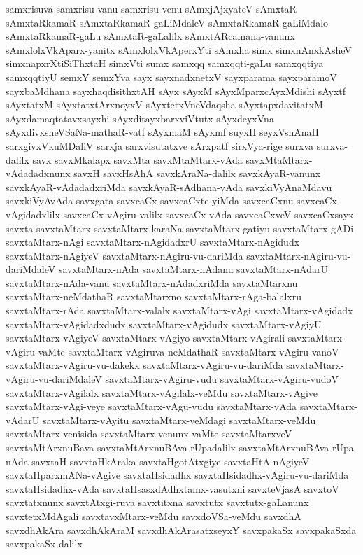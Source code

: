 {samxrisuva
samxrisu-vanu
samxrisu-venu
sAmxjAjxyateV
sAmxtaR
sAmxtaRkamaR
sAmxtaRkamaR-gaLiMdaleV
sAmxtaRkamaR-gaLiMdalo
sAmxtaRkamaR-gaLu
sAmxtaR-gaLalilx
sAmxtARcamana-vanunx
sAmxlolxVkAparx-yanitx
sAmxlolxVkAperxYti
sAmxha
simx
simxnAnxkAsheV
simxnapxrXtiSiThxtaH
simxVti
sumx
samxqq
samxqqti-gaLu
samxqqtiya
samxqqtiyU
semxY
semxYva
sayx
sayxnadxnetxV
sayxparama
sayxparamoV
sayxbaMdhana
sayxhaqdisithxtAH
sAyx
sAyxM
sAyxMparxcAyxMdishi
sAyxtf
sAyxtatxM
sAyxtatxtArxnoyxV
sAyxtetxVneVdaqsha
sAyxtapxdavitatxM
sAyxdamaqtatavxsayxhi
sAyxditayxbarxviVtutx
sAyxdeyxVna
sAyxdivxsheVSaNa-mathaR-vatf
sAyxmaM
sAyxmf
suyxH
seyxVshAnaH
sarxgivxVkuMDaliV
sarxja
sarxvisutatxve
sArxpatf
sirxVya-rige
surxva
surxva-dalilx
savx
savxMkalapx
savxMta
savxMtaMtarx-vAda
savxMtaMtarx-vAdadadxnunx
savxH
savxHsAhA
savxkAraNa-dalilx
savxkAyaR-vanunx
savxkAyaR-vAdadadxriMda
savxkAyaR-sAdhana-vAda
savxkiVyAnaMdavu
savxkiVyAvAda
savxgata
savxcaCx
savxcaCxte-yiMda
savxcaCxnu
savxcaCx-vAgidadxlilx
savxcaCx-vAgiru-valilx
savxcaCx-vAda
savxcaCxveV
savxcaCxsayx
savxta
savxtaMtarx
savxtaMtarx-karaNa
savxtaMtarx-gatiyu
savxtaMtarx-gADi
savxtaMtarx-nAgi
savxtaMtarx-nAgidadxrU
savxtaMtarx-nAgidudx
savxtaMtarx-nAgiyeV
savxtaMtarx-nAgiru-vu-dariMda
savxtaMtarx-nAgiru-vu-dariMdaleV
savxtaMtarx-nAda
savxtaMtarx-nAdanu
savxtaMtarx-nAdarU
savxtaMtarx-nAda-vanu
savxtaMtarx-nAdadxriMda
savxtaMtarxnu
savxtaMtarx-neMdathaR
savxtaMtarxno
savxtaMtarx-rAga-balalxru
savxtaMtarx-rAda
savxtaMtarx-valalx
savxtaMtarx-vAgi
savxtaMtarx-vAgidadx
savxtaMtarx-vAgidadxdudx
savxtaMtarx-vAgidudx
savxtaMtarx-vAgiyU
savxtaMtarx-vAgiyeV
savxtaMtarx-vAgiyo
savxtaMtarx-vAgirali
savxtaMtarx-vAgiru-vaMte
savxtaMtarx-vAgiruva-neMdathaR
savxtaMtarx-vAgiru-vanoV
savxtaMtarx-vAgiru-vu-dakekx
savxtaMtarx-vAgiru-vu-dariMda
savxtaMtarx-vAgiru-vu-dariMdaleV
savxtaMtarx-vAgiru-vudu
savxtaMtarx-vAgiru-vudoV
savxtaMtarx-vAgilalx
savxtaMtarx-vAgilalx-veMdu
savxtaMtarx-vAgive
savxtaMtarx-vAgi-veye
savxtaMtarx-vAgu-vudu
savxtaMtarx-vAda
savxtaMtarx-vAdarU
savxtaMtarx-vAyitu
savxtaMtarx-veMdagi
savxtaMtarx-veMdu
savxtaMtarx-venisida
savxtaMtarx-venunx-vaMte
savxtaMtarxveV
savxtaMtArxnuBava
savxtaMtArxnuBAva-rUpadalilx
savxtaMtArxnuBAva-rUpa-nAda
savxtaH
savxtaHkAraka
savxtaHgotAtxgiye
savxtaHtA-nAgiyeV
savxtaHparxmANa-vAgive
savxtaHsidadhx
savxtaHsidadhx-vAgiru-vu-dariMda
savxtaHsidadhx-vAda
savxtaHsasxdAdhxtamx-vasutxni
savxteVjasA
savxtoV
savxtatxnunx
savxtAtxgi-ruva
savxtitxna
savxtutx
savxtutx-gaLanunx
savxtetxMdAgali
savxtavxMtarx-veMdu
savxdoVSa-veMdu
savxdhA
savxdhAkAra
savxdhAkAraM
savxdhAkArasatxseyxY
savxpakaSx
savxpakaSxda
savxpakaSx-dalilx
}
